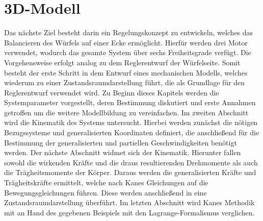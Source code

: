 \section{3D-Modell}
Das nächste Ziel besteht darin ein Regelungskonzept zu entwickeln, welches das Balancieren des Würfels auf einer Ecke ermöglicht. Hierfür werden drei Motor verwendet, wodurch das gesamte System über sechs Freiheitsgrade verfügt. Die Vorgehensweise erfolgt analog zu dem Reglerentwurf der Würfelseite. Somit besteht der erste Schritt in dem Entwurf eines mechanischen Modells, welches wiederum zu einer Zustandsraumdarstellung führt, die als Grundlage für den Reglerentwurf verwendet wird.
Zu Beginn dieses Kapitels werden die Systemparameter vorgestellt, deren Bestimmung diskutiert und erste Annahmen getroffen um die weitere Modellbildung zu vereinfachen. Im zweiten Abschnitt wird die Kinematik des Systems untersucht. Hierbei werden zunächst die nötigen Bezugssysteme und generalisierten Koordinaten definiert, die anschließend für die Bestimmung der generalisierten und partiellen Geschwindigkeiten benötigt werden.
Der nächste Abschnitt widmet sich der Kinematik. Hierunter fallen sowohl die wirkenden Kräfte und die draus resultierenden Drehmomente als auch die Trägheitsmomente der Körper. Daraus werden die generalisierten Kräfte und Trägheitskräfte ermittelt, welche nach Kanes Gleichungen auf die Bewegungsgleichungen führen. Diese werden anschließend in eine Zustandsraumdarstellung überführt.
Im letzten Abschnitt wird Kanes Methodik mit an Hand des gegebenen Beispiels mit den Lagrange-Formalismus verglichen.

